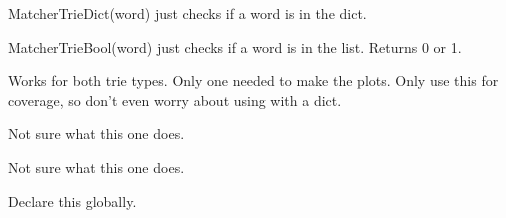 \begin{fulllineitems}

\begin{fulllineitems}
\label{labMTsimple:labMTsimple.speedy.sentiDict.matcherDictBool}
MatcherTrieDict(word) just checks if a word is in the dict.

\end{fulllineitems}


\begin{fulllineitems}
\label{labMTsimple:labMTsimple.speedy.sentiDict.matcherTrieBool}
MatcherTrieBool(word) just checks if a word is in the list.
Returns 0 or 1.

Works for both trie types.
Only one needed to make the plots.
Only use this for coverage, so don't even worry about using with a dict.

\end{fulllineitems}


\begin{fulllineitems}
\label{labMTsimple:labMTsimple.speedy.sentiDict.matcherTrieDict}
Not sure what this one does.

\end{fulllineitems}


\begin{fulllineitems}
\label{labMTsimple:labMTsimple.speedy.sentiDict.matcherTrieMarisa}
Not sure what this one does.

\end{fulllineitems}


\begin{fulllineitems}
\label{labMTsimple:labMTsimple.speedy.sentiDict.my_marisa}
Declare this globally.


\end{fulllineitems}
\end{fulllineitems}
